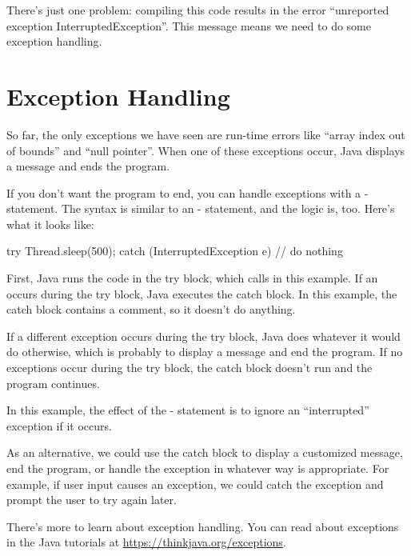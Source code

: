 
There's just one problem: compiling this code results in the error ``unreported exception InterruptedException''.
This message means we need to do some exception handling.


\section{Exception Handling}

So far, the only exceptions we have seen are run-time errors like ``array index out of bounds'' and ``null pointer''.
When one of these exceptions occur, Java displays a message and ends the program.

If you don't want the program to end, you can handle exceptions with a - statement.
The syntax is similar to an - statement, and the logic is, too.
Here's what it looks like:


\begin{code}
try {
    Thread.sleep(500);
} catch (InterruptedException e) {
    // do nothing
}
\end{code}

First, Java runs the code in the try block, which calls  in this example.
If an  occurs during the try block, Java executes the catch block.
In this example, the catch block contains a comment, so it doesn't do anything.

If a different exception occurs during the try block, Java does whatever it would do otherwise, which is probably to display a message and end the program.
If no exceptions occur during the try block, the catch block doesn't run and the program continues.

In this example, the effect of the - statement is to ignore an ``interrupted'' exception if it occurs.

As an alternative, we could use the catch block to display a customized message, end the program, or handle the exception in whatever way is appropriate.
For example, if user input causes an exception, we could catch the exception and prompt the user to try again later.

There's more to learn about exception handling.
You can read about exceptions in the Java tutorials at \url{https://thinkjava.org/exceptions}.


